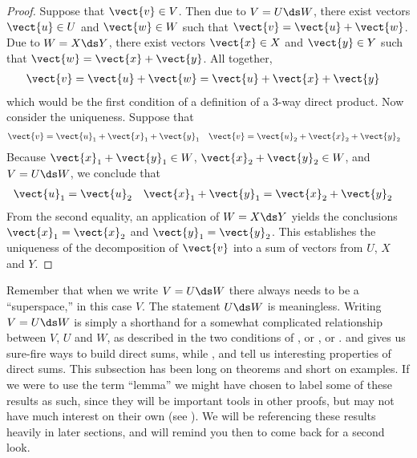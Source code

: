 %
\begin{proof}
Suppose that  $\vect{v}\in V$.  Then due to $V=U\ds W$, there exist vectors $\vect{u}\in U$ and $\vect{w}\in W$ such that $\vect{v}=\vect{u}+\vect{w}$.   Due to $W=X\ds Y$, there exist vectors $\vect{x}\in X$ and $\vect{y}\in Y$ such that $\vect{w}=\vect{x}+\vect{y}$.   All together,
%
\begin{align*}
\vect{v}&=\vect{u}+\vect{w}=\vect{u}+\vect{x}+\vect{y}
\end{align*}
%
which would be the first condition of a definition of a 3-way direct product.  Now consider the uniqueness.  Suppose that
%
\begin{align*}
\vect{v}&=\vect{u}_1+\vect{x}_1+\vect{y}_1
&
\vect{v}&=\vect{u}_2+\vect{x}_2+\vect{y}_2
\end{align*}
%
Because $\vect{x}_1+\vect{y}_1\in W$, $\vect{x}_2+\vect{y}_2\in W$, and $V=U\ds W$, we conclude that
%
\begin{align*}
\vect{u}_1&=\vect{u}_2
&
\vect{x}_1+\vect{y}_1&=\vect{x}_2+\vect{y}_2
\end{align*}
%
From the second equality, an application of $W=X\ds Y$ yields the conclusions $\vect{x}_1=\vect{x}_2$ and $\vect{y}_1=\vect{y}_2$.  This establishes the uniqueness of the decomposition of $\vect{v}$ into a sum of vectors from $U$, $X$ and $Y$.
%
\end{proof}
%
Remember that when we write $V=U\ds W$ there always needs to be a ``superspace,'' in this case $V$.  The statement $U\ds W$ is meaningless.  Writing $V=U\ds W$ is simply a shorthand for a somewhat complicated relationship between $V$, $U$ and $W$, as described in the two conditions of , or , or .   and  gives us sure-fire ways to build direct sums, while ,   and  tell us interesting properties of direct sums.
%
This subsection has been long on theorems and short on examples.  If we were to use the term ``lemma'' we might have chosen to label some of these results as such, since they will be important tools in other proofs, but may not have much interest on their own (see ).  We will be referencing these results heavily in later sections, and will remind you then to come back for a second look.
%
%


